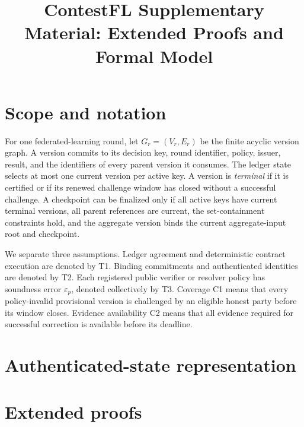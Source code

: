 \documentclass[10pt]{article}
\title{ContestFL Supplementary Material: Extended Proofs and Formal Model}
\author{}
\date{}
\begin{document}
\maketitle

\section{Scope and notation}
For one federated-learning round, let $G_r=(V_r,E_r)$ be the finite acyclic
version graph.  A version commits to its decision key, round identifier, policy,
issuer, result, and the identifiers of every parent version it consumes.  The
ledger state selects at most one current version per active key.  A version is
\emph{terminal} if it is certified or if its renewed challenge window has
closed without a successful challenge.  A checkpoint can be finalized only if
all active keys have current terminal versions, all parent references are
current, the set-containment constraints hold, and the aggregate version binds
the current aggregate-input root and checkpoint.

We separate three assumptions.  Ledger agreement and deterministic contract
execution are denoted by T1.  Binding commitments and authenticated identities
are denoted by T2.  Each registered public verifier or resolver policy has
soundness error $\varepsilon_p$, denoted collectively by T3.  Coverage C1 means
that every policy-invalid provisional version is challenged by an eligible
honest party before its window closes.  Evidence availability C2 means that all
evidence required for successful correction is available before its deadline.

\section{Authenticated-state representation}


\section{Extended proofs}
\end{document}
